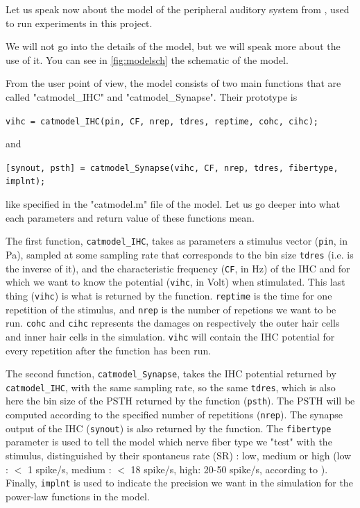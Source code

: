 Let us speak now about the model of the peripheral auditory system from 
\cite{Model1, Model2, Model3}, used to run experiments in this project. 

We will not go into the details of the model, but we will speak more about the use of it. 
You can see in \autoref{fig:modelsch} the schematic of the model.



From the user point of view, the model consists of two main functions 
that are called "catmodel\_IHC" and "catmodel\_Synapse". Their prototype is

\texttt{vihc = catmodel\_IHC(pin, CF, nrep, tdres, reptime, cohc, cihc);}

and

\texttt{[synout, psth] = catmodel\_Synapse(vihc, CF, nrep, tdres, fibertype, implnt);}

like specified in the "catmodel.m" file of the model. 
Let us go deeper into what each parameters and return value of these functions mean.

The first function, \texttt{catmodel\_IHC}, takes as parameters 
a stimulus vector (\texttt{pin}, in Pa), sampled at some sampling rate that corresponds 
to the bin size \texttt{tdres} (i.e. is the inverse of it), and 
the characteristic frequency (\texttt{CF}, in Hz) 
of the IHC and for which we want to know the potential 
(\texttt{vihc}, in Volt) when stimulated. 
This last thing (\texttt{vihc}) is what is returned by the function. 
\texttt{reptime} is the time for one repetition of the stimulus, 
and \texttt{nrep} is the number of repetions we want to be run. 
\texttt{cohc} and \texttt{cihc} represents the damages on respectively 
the outer hair cells and inner hair cells in the simulation.
\texttt{vihc} will contain the IHC potential for every repetition 
after the function has been run.

The second function, \texttt{catmodel\_Synapse}, 
takes the IHC potential returned by \texttt{catmodel\_IHC}, 
with the same sampling rate, so the same \texttt{tdres}, which is also here the bin size
of the PSTH returned by the function (\texttt{psth}). 
The PSTH will be computed according to the specified number of repetitions (\texttt{nrep}).
The synapse output of the IHC (\texttt{synout}) is also returned by the function.
The \texttt{fibertype} parameter is used to tell the model which nerve fiber type
we "test" with the stimulus, distinguished by their spontaneus rate (SR) : 
low, medium or high (low : $<$ 1 spike/s, medium : $<$ 18 spike/s, high: 20-50 spike/s, 
according to \cite{AuditoryNeuroscience}). %
Finally, \texttt{implnt} is used to indicate the precision we want in the simulation 
for the power-law functions in the model.

